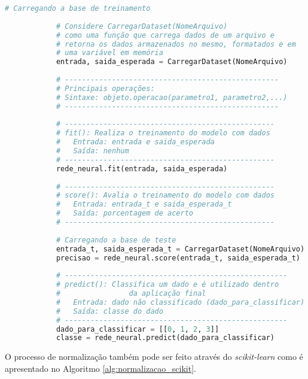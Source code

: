 \documentclass[12pt,oneside,a4paper,chapter=TITLE,section=TITLE,sumario
		=tradicional]{abntex2}
\begin{document}
		\begin{algoritmo}[H]
			\begin{lstlisting}[language=Python, literate={{â}{{\^a}}1{á}{{\'a}}1{à}{{\`a}}1{ã}{{\~a}}1{é}{{\'e}}1{ê}{{\^e}}1{í}{{\'i}}1{ó}{{\'o}}1{õ}{{\~o}}1{ú}{{\'u}}1{ü}{{\"u}}1{ç}{{\c{c}}}1}]		
			# Carregando a base de treinamento
			
			# Considere CarregarDataset(NomeArquivo) 
			# como uma função que carrega dados de um arquivo e 
			# retorna os dados armazenados no mesmo, formatados e em
			# uma variável em memória
			entrada, saida_esperada = CarregarDataset(NomeArquivo)
			
			# --------------------------------------------------
			# Principais operações:
			# Sintaxe: objeto.operacao(parametro1, parametro2,...)
			# --------------------------------------------------
			
			# -------------------------------------------------
			# fit(): Realiza o treinamento do modelo com dados
			# 	Entrada: entrada e saida_esperada
			# 	Saída: nenhum	
			# -------------------------------------------------	
			rede_neural.fit(entrada, saida_esperada)
			
			# -------------------------------------------------
			# score(): Avalia o treinamento do modelo com dados
			# 	Entrada: entrada_t e saida_esperada_t
			# 	Saída: porcentagem de acerto
			# -------------------------------------------------
			
			# Carregando a base de teste
			entrada_t, saida_esperada_t = CarregarDataset(NomeArquivo)	
			precisao = rede_neural.score(entrada_t, saida_esperada_t)
			
			# ----------------------------------------------------
			# predict(): Classifica um dado e é utilizado dentro 
			# 			     da aplicação final
			# 	Entrada: dado não classificado (dado_para_classificar)
			# 	Saída: classe do dado
			# ----------------------------------------------------	
			dado_para_classificar = [[0, 1, 2, 3]]
			classe = rede_neural.predict(dado_para_classificar)
			\end{lstlisting}
		\end{algoritmo}
		
		O processo de normalização também pode ser feito através do \textit{scikit-learn} como é apresentado no Algoritmo \ref{alg:normalizacao_scikit}.
		
\end{document}
